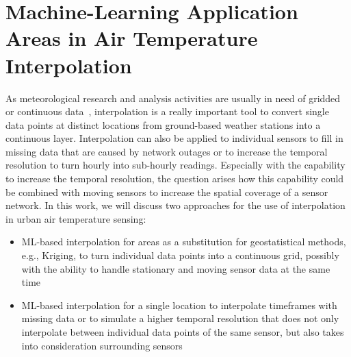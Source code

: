 \section{Machine-Learning Application Areas in Air Temperature Interpolation}

As meteorological research and analysis activities are usually in need of gridded or continuous data~\cite{sekulic2020spatio}, interpolation is a really important tool to convert single data points at distinct locations from ground-based weather stations into a continuous layer. Interpolation can also be applied to individual sensors to fill in missing data that are caused by network outages or to increase the temporal resolution to turn hourly into sub-hourly readings. Especially with the capability to increase the temporal resolution, the question arises how this capability could be combined with moving sensors to increase the spatial coverage of a sensor network. In this work, we will discuss two approaches for the use of interpolation in urban air temperature sensing:

\begin{itemize}
    \item ML-based interpolation for areas as a substitution for geostatistical methods, e.g., Kriging, to turn individual data points into a continuous grid, possibly with the ability to handle stationary and moving sensor data at the same time
    \item ML-based interpolation for a single location to interpolate timeframes with missing data or to simulate a higher temporal resolution that does not only interpolate between individual data points of the same sensor, but also takes into consideration surrounding sensors
\end{itemize}

